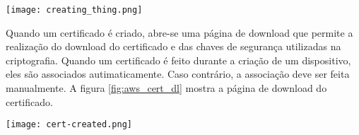 \begin{center}
	\centering 
	\texttt{[image: creating\_thing.png]}
	\label{fig:aws_creating_thing}
\end{center} 

Quando um certificado é criado, abre-se uma página de download que permite a
realização do download do certificado e das chaves de segurança utilizadas na
criptografia. Quando um certificado é feito durante a criação de um dispositivo,
eles são associados autimaticamente. Caso contrário, a associação deve ser feita
manualmente. A figura \ref{fig:aws_cert_dl} mostra a página de download do
certificado.

\begin{center}
	\centering 
	\texttt{[image: cert-created.png]}
	\label{fig:aws_cert_dl}
\end{center} 



